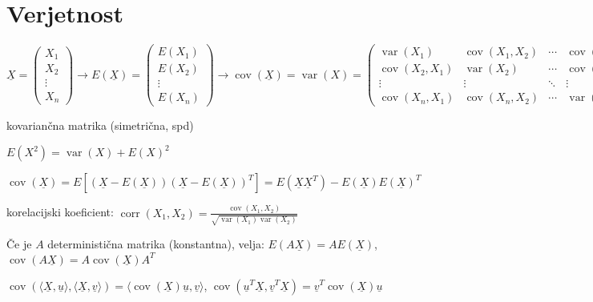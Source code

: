\documentclass[11pt,a4paper]{amsart}
\theoremstyle{definition} %
\theoremstyle{plain} %
\newcommand{\X}{\underline{X}}
\newcommand{\uu}{\underline{u}}
\newcommand{\uv}{\underline{v}}
\DeclareMathOperator{\cov}{cov}
\DeclareMathOperator{\var}{var}
\DeclareMathOperator{\corr}{corr}
\begin{document}
\thispagestyle{empty}
\setlength{\parindent}{0pt}




\section*{Verjetnost}

$\X = \left( \begin{matrix}
  X_1 \\ X_2 \\ \vdots \\ X_n
\end{matrix} \right)
\longrightarrow E(\X) = \left( \begin{matrix} E(X_1) \\ E(X_2) \\ \vdots \\ E(X_n) \end{matrix} \right)
\longrightarrow \cov(\X) = \var(X) = \left(
\begin{matrix}
  \var(X_1)  & \cov(X_1,X_2) & \cdots & \cov(X_1,X_n) \\
  \cov(X_2,X_1) & \var(X_2) & \cdots & \cov(X_2, X_n) \\
  \vdots  & \vdots & \ddots & \vdots \\
  \cov(X_n, X_1) & \cov(X_n,X_2) & \cdots & \var(X_n)
\end{matrix}   \right)$

kovariančna matrika (simetrična, spd)


$E(X^2) = \var(X) + E(X)^2$

$\cov(\X) = E[(\X-E(\X))(\X - E(\X))^T] = E(\X\X^T) - E(\X)E(\X)^T$

korelacijski koeficient: $\corr(X_1,X_2) = \frac{\cov(X_1,X_2)}{\sqrt{\var(X_1)
\var(X_2)}}$

 Če je $A$ deterministična matrika (konstantna), velja: $E(A\X) = A E(\X)$,
 $\cov(A\X) = A\cov(\X)A^T$

 $\cov(\langle \X, \uu \rangle , \langle \X, \uv \rangle) =
 \langle \cov(\X)\uu,\uv \rangle$, $\cov (\uu^T
 \X, \uv^T \X) = \uv^T \cov(\X) \uu$
\end{document}
